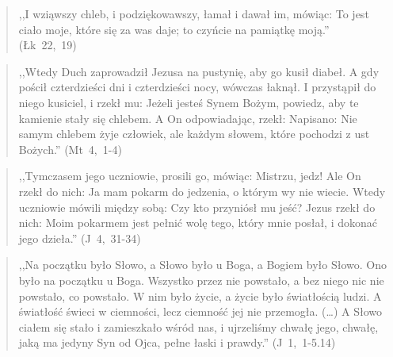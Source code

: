 \documentclass[10pt,a4paper,oneside]{article}
\begin{document}
\begin{quote}
,,I wziąwszy chleb, i podziękowawszy, łamał i dawał im, mówiąc: To jest ciało moje, które się za was daje; to czyńcie na pamiątkę moją.'' \mbox{(Łk 22, 19)}
\end{quote}
\begin{quote}
,,Wtedy Duch zaprowadził Jezusa na pustynię, aby go kusił diabeł. A gdy pościł czterdzieści dni i czterdzieści nocy, wówczas łaknął. I przystąpił do niego kusiciel, i rzekł mu: Jeżeli jesteś Synem Bożym, powiedz, aby te kamienie stały się chlebem. A On odpowiadając, rzekł: Napisano: Nie samym chlebem żyje człowiek, ale każdym słowem, które pochodzi z ust Bożych.'' \mbox{(Mt 4, 1-4)}
\end{quote}
\begin{quote}
,,Tymczasem jego uczniowie, prosili go, mówiąc: Mistrzu, jedz! Ale On rzekł do nich: Ja mam pokarm do jedzenia, o którym wy nie wiecie. Wtedy uczniowie mówili między sobą: Czy kto przyniósł mu jeść? Jezus rzekł do nich: Moim pokarmem jest pełnić wolę tego, który mnie posłał, i dokonać jego dzieła.'' \mbox{(J 4, 31-34)}
\end{quote}
\begin{quote}
,,Na początku było Słowo, a Słowo było u Boga, a Bogiem było Słowo. Ono było na początku u Boga. Wszystko przez nie powstało, a bez niego nic nie powstało, co powstało. W nim było życie, a życie było światłością ludzi. A światłość świeci w ciemności, lecz ciemność jej nie przemogła. (\ldots) A Słowo ciałem się stało i zamieszkało wśród nas, i ujrzeliśmy chwałę jego, chwałę, jaką ma jedyny Syn od Ojca, pełne łaski i prawdy.'' \mbox{(J 1, 1-5.14)}
\end{quote}
\end{document}
